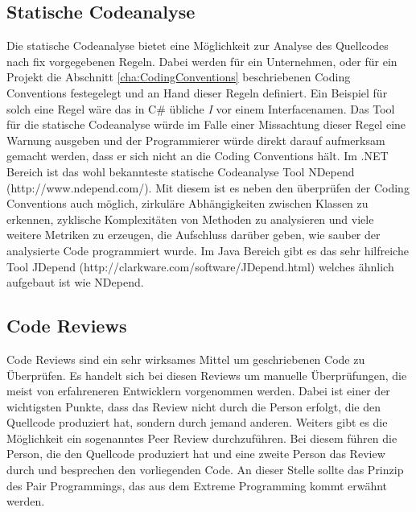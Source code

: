 \subsection{Statische Codeanalyse}
Die statische Codeanalyse bietet eine Möglichkeit zur Analyse des Quellcodes nach fix vorgegebenen Regeln. Dabei werden für ein Unternehmen, oder für ein Projekt die Abschnitt \ref{cha:CodingConventions} beschriebenen Coding Conventions festegelegt und an Hand dieser Regeln definiert. Ein Beispiel für solch eine Regel wäre das in C\# übliche \textit{I} vor einem Interfacenamen. Das Tool für die statische Codeanalyse würde im Falle einer Missachtung dieser Regel eine Warnung ausgeben und der Programmierer würde direkt darauf aufmerksam gemacht werden, dass er sich nicht an die Coding Conventions hält. Im .NET Bereich ist das wohl bekannteste statische Codeanalyse Tool NDepend (http://www.ndepend.com/). Mit diesem ist es neben den überprüfen der Coding Conventions auch möglich, zirkuläre Abhängigkeiten zwischen Klassen zu erkennen, zyklische Komplexitäten von Methoden zu analysieren und viele weitere Metriken zu erzeugen, die Aufschluss darüber geben, wie sauber der analysierte Code programmiert wurde. Im Java Bereich gibt es das sehr hilfreiche Tool JDepend (http://clarkware.com/software/JDepend.html) welches ähnlich aufgebaut ist wie NDepend.

\subsection{Code Reviews}
Code Reviews sind ein sehr wirksames Mittel um geschriebenen Code zu Überprüfen. Es handelt sich bei diesen Reviews um manuelle Überprüfungen, die meist von erfahreneren Entwicklern vorgenommen werden. Dabei ist einer der wichtigsten Punkte, dass das Review nicht durch die Person erfolgt, die den Quellcode produziert hat, sondern durch jemand anderen. Weiters gibt es die Möglichkeit ein sogenanntes Peer Review durchzuführen. Bei diesem führen die Person, die den Quellcode produziert hat und eine zweite Person das Review durch und besprechen den vorliegenden Code. An dieser Stelle sollte das Prinzip des Pair Programmings, das aus dem Extreme Programming kommt erwähnt werden. \cite{Beck2005} 